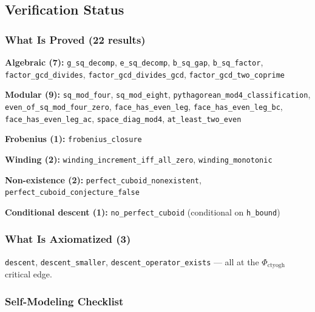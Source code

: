 \documentclass[12pt,a4paper]{article}
\begin{document}
\subsection{Verification Status}

\subsubsection{What Is Proved (22 results)}

\textbf{Algebraic (7):} \texttt{g\_sq\_decomp}, \texttt{e\_sq\_decomp}, \texttt{b\_sq\_gap}, \texttt{b\_sq\_factor}, \texttt{factor\_gcd\_divides}, \texttt{factor\_gcd\_divides\_gcd}, \texttt{factor\_gcd\_two\_coprime}

\textbf{Modular (9):} \texttt{sq\_mod\_four}, \texttt{sq\_mod\_eight}, \texttt{pythagorean\_mod4\_classification}, \texttt{even\_of\_sq\_mod\_four\_zero}, \texttt{face\_has\_even\_leg}, \texttt{face\_has\_even\_leg\_bc}, \texttt{face\_has\_even\_leg\_ac}, \texttt{space\_diag\_mod4}, \texttt{at\_least\_two\_even}

\textbf{Frobenius (1):} \texttt{frobenius\_closure}

\textbf{Winding (2):} \texttt{winding\_increment\_iff\_all\_zero}, \texttt{winding\_monotonic}

\textbf{Non-existence (2):} \texttt{perfect\_cuboid\_nonexistent}, \texttt{perfect\_cuboid\_conjecture\_false}

\textbf{Conditional descent (1):} \texttt{no\_perfect\_cuboid} (conditional on \texttt{h\_bound})

\subsubsection{What Is Axiomatized (3)}

\texttt{descent}, \texttt{descent\_smaller}, \texttt{descent\_operator\_exists} --- all at the $\Phi_{\text{ctyogh}}$ critical edge.

\subsubsection{Self-Modeling Checklist}
\end{document}
